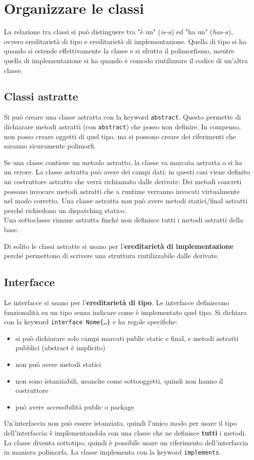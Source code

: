 \chapter{Organizzare le classi}

La relazione tra classi si può distinguere tra "è un" (\textit{is-a}) ed "ha un" (\textit{has-a}), ovvero ereditarietà di tipo e ereditarietà di implementazione. Quella di tipo si ha quando si estende effettivamente la classe e si sfrutta il polimorfismo, mentre quella di implementazione si ha quando è comodo riutilizzare il codice di un'altra classe.
\section{Classi astratte}
Si può creare una classe astratta con la keyword \texttt{abstract}. Questo permette di dichiarare metodi astratti (con \texttt{abstract}) che posso non definire. In compenso, non posso creare oggetti di quel tipo, ma si possono creare dei riferimenti che saranno sicuramente polimorfi.

Se una classe contiene un metodo astratto, la classe va marcata astratta o si ha un errore.
La classe astratta può avere dei campi dati; in questi casi viene definito un costruttore astratto che verrà richiamato dalle derivate.
Dei metodi concreti possono invocare metodi astratti che a runtime verranno invocati virtualmente nel modo corretto.
Una classe astratta non può avere metodi statici/final astratti perché richiedono un dispatching statico. \\
Una sottoclasse rimane astratta finché non definisce tutti i metodi astratti della base.

Di solito le classi astratte si usano per l'\textbf{ereditarietà di implementazione} perché permettono di scrivere una struttura riutilizzabile dalle derivate.

\section{Interfacce}
Le interfacce si usano per l'\textbf{ereditarietà di tipo}. Le interfacce definiscono funzionalità su un tipo senza indicare come è implementato quel tipo. Si dichiara con la keyword \texttt{interface Nome\{…\}} e ha regole specifiche:
\begin{itemize}
\item si può dichiarare solo campi marcati public static e final, e metodi astratti pubblici (abstract è implicito)
\item non può avere metodi statici
\item non sono istanziabili, neanche come sottooggetti, quindi non hanno il costruttore
\item può avere accessibilità public o package
\end{itemize}
Un'interfaccia non può essere istanziata, quindi l'unico modo per usare il tipo dell'interfaccia è implementandola con una classe che ne definisce \textbf{tutti} i metodi. La classe diventa sottotipo, quindi è possibile usare un riferimento dell'interfaccia in maniera polimorfa. La classe implementa con la keyword \texttt{implements}. 

